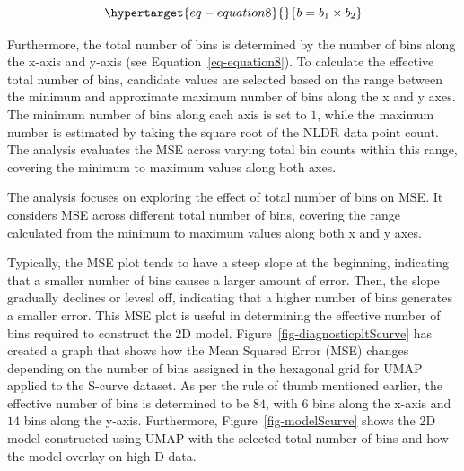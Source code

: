 \documentclass[
  12pt]{article}
\begin{document}
\begin{equation}\protect\hypertarget{eq-equation8}{}{
b = b_1 \times b_2
}\label{eq-equation8}\end{equation}

Furthermore, the total number of bins is determined by the number of
bins along the x-axis and y-axis (see Equation~\ref{eq-equation8}). To
calculate the effective total number of bins, candidate values are
selected based on the range between the minimum and approximate maximum
number of bins along the x and y axes. The minimum number of bins along
each axis is set to \(1\), while the maximum number is estimated by
taking the square root of the NLDR data point count. The analysis
evaluates the MSE across varying total bin counts within this range,
covering the minimum to maximum values along both axes.

The analysis focuses on exploring the effect of total number of bins on
MSE. It considers MSE across different total number of bins, covering
the range calculated from the minimum to maximum values along both x and
y axes.

Typically, the MSE plot tends to have a steep slope at the beginning,
indicating that a smaller number of bins causes a larger amount of
error. Then, the slope gradually declines or levesl off, indicating that
a higher number of bins generates a smaller error. This MSE plot is
useful in determining the effective number of bins required to construct
the 2D model. Figure~\ref{fig-diagnosticpltScurve} has created a graph
that shows how the Mean Squared Error (MSE) changes depending on the
number of bins assigned in the hexagonal grid for UMAP applied to the
S-curve dataset. As per the rule of thumb mentioned earlier, the
effective number of bins is determined to be \(84\), with \(6\) bins
along the x-axis and \(14\) bins along the y-axis. Furthermore,
Figure~\ref{fig-modelScurve} shows the 2D model constructed using UMAP
with the selected total number of bins and how the model overlay on
high-D data.
\end{document}
